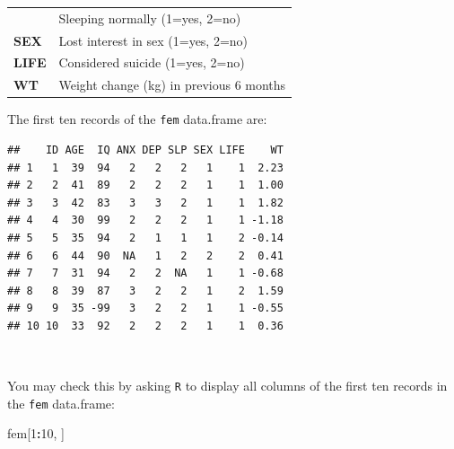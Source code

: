 \documentclass[12pt,a4paper]{book}
\newenvironment{Shaded}{\begin{snugshade}}{\end{snugshade}}
\newcommand{\DecValTok}[1]{\textcolor[rgb]{0.00,0.00,0.81}{#1}}
\newcommand{\OperatorTok}[1]{\textcolor[rgb]{0.81,0.36,0.00}{\textbf{#1}}}
\newcommand{\NormalTok}[1]{#1}
\theoremstyle{definition}
\theoremstyle{definition}
\theoremstyle{definition}
\theoremstyle{remark}
\begin{document}
\begin{longtable}[]{@{}ll@{}}
\begin{minipage}[t]{0.14\columnwidth}
\end{minipage} & \begin{minipage}[t]{0.69\columnwidth}\raggedright
Sleeping normally (1=yes, 2=no)\strut
\end{minipage}\tabularnewline
\begin{minipage}[t]{0.14\columnwidth}\raggedright
\textbf{SEX}\strut
\end{minipage} & \begin{minipage}[t]{0.69\columnwidth}\raggedright
Lost interest in sex (1=yes, 2=no)\strut
\end{minipage}\tabularnewline
\begin{minipage}[t]{0.14\columnwidth}\raggedright
\textbf{LIFE}\strut
\end{minipage} & \begin{minipage}[t]{0.69\columnwidth}\raggedright
Considered suicide (1=yes, 2=no)\strut
\end{minipage}\tabularnewline
\begin{minipage}[t]{0.14\columnwidth}\raggedright
\textbf{WT}\strut
\end{minipage} & \begin{minipage}[t]{0.69\columnwidth}\raggedright
Weight change (kg) in previous 6 months\strut
\end{minipage}\tabularnewline
\bottomrule
\end{longtable}

\newpage

The first ten records of the \texttt{fem} data.frame are:

\begin{verbatim}
##    ID AGE  IQ ANX DEP SLP SEX LIFE    WT
## 1   1  39  94   2   2   2   1    1  2.23
## 2   2  41  89   2   2   2   1    1  1.00
## 3   3  42  83   3   3   2   1    1  1.82
## 4   4  30  99   2   2   2   1    1 -1.18
## 5   5  35  94   2   1   1   1    2 -0.14
## 6   6  44  90  NA   1   2   2    2  0.41
## 7   7  31  94   2   2  NA   1    1 -0.68
## 8   8  39  87   3   2   2   1    2  1.59
## 9   9  35 -99   3   2   2   1    1 -0.55
## 10 10  33  92   2   2   2   1    1  0.36
\end{verbatim}

~

You may check this by asking \texttt{R} to display all columns of the
first ten records in the \texttt{fem} data.frame:

\begin{Shaded}
\begin{Highlighting}[]
\NormalTok{fem[}\DecValTok{1}\OperatorTok{:}\DecValTok{10}\NormalTok{, ]}
\end{Highlighting}
\end{Shaded}
\end{document}
